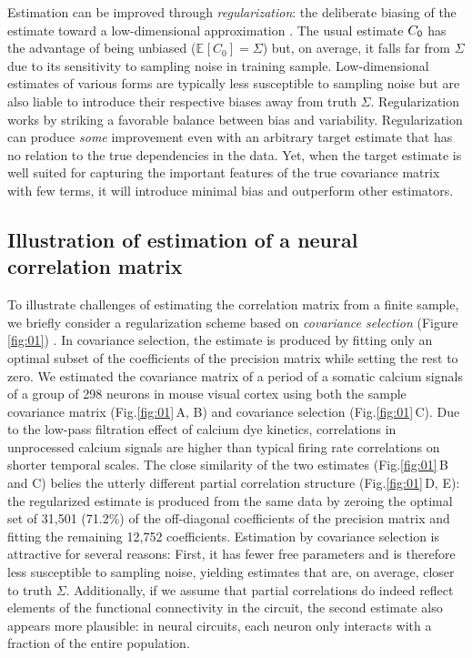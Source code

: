 \documentclass[10pt]{article}
\newcommand{\E}[2][]{\mathbb E_{#1}\left[ #2\right]}    %
\begin{document}
Estimation can be improved through \emph{regularization}: the deliberate biasing of the estimate toward a low-dimensional approximation \cite{Schafer:2005,Bickel:2006}.  The usual estimate $C_{\sf 0}$ has the advantage of being unbiased ($\E{C_0}=\Sigma$) but, on average, it falls far from $\Sigma$ due to its sensitivity to sampling noise in training sample.  Low-dimensional estimates of various forms are typically less susceptible to sampling noise but are also liable to introduce their respective biases away from truth $\Sigma$.  Regularization works by striking a favorable balance between bias and variability. Regularization can produce \emph{some} improvement even with an arbitrary target estimate that has no relation to the true dependencies in the data.  Yet, when the target estimate is well suited for capturing the important features of the true covariance matrix with few terms, it will introduce minimal bias and outperform other estimators. 

\subsection*{Illustration of estimation of a neural correlation matrix}
To illustrate challenges of estimating the correlation matrix from a finite sample, we briefly consider a regularization scheme based on \emph{covariance selection} (Figure \ref{fig:01}) \cite{Dempster:1972}. In covariance selection, the estimate is produced by fitting only an optimal subset of the coefficients of the precision matrix while setting the rest to zero. We estimated the covariance matrix of a period of a somatic calcium signals of a group of 298 neurons in mouse visual cortex using both the sample covariance matrix (Fig.\;\ref{fig:01}\,A, B) and covariance selection (Fig.\;\ref{fig:01}\,C). Due to the low-pass filtration effect of calcium dye kinetics, correlations in unprocessed calcium signals are higher than typical firing rate correlations on shorter temporal scales. The close similarity of the two estimates (Fig.\;\ref{fig:01}\,B and C) belies the utterly different partial correlation structure (Fig.\;\ref{fig:01}\,D, E): the regularized estimate is produced from the same data by zeroing the optimal set of 31,501 (71.2\%) of the off-diagonal coefficients of the precision matrix and fitting the remaining 12,752 coefficients. Estimation by covariance selection is attractive for several reasons: First, it has fewer free parameters and is therefore less susceptible to sampling noise, yielding estimates that are, on average, closer to truth $\Sigma$. Additionally, if we assume that partial correlations do indeed reflect elements of the functional connectivity in the circuit, the second estimate also appears more plausible: in neural circuits, each neuron only interacts with a fraction of the entire population.
\end{document}
